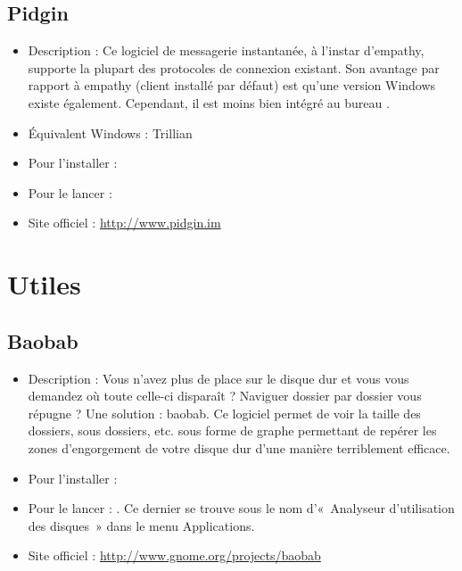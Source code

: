 \subsection{Pidgin}
\label{RefPidgin}
\begin{itemize}
\begingroup
{}
\item Description : Ce logiciel de messagerie instantanée, à l'instar d'empathy, supporte la plupart des protocoles de connexion existant. Son avantage par rapport à empathy (client installé par défaut) est qu'une version Windows existe également. Cependant, il est moins bien intégré au bureau .{\par}
\item Équivalent Windows : Trillian{\par}
\item Pour l'installer : 
\item Pour le lancer : 
\item Site officiel : \url{http://www.pidgin.im}{\par}
\endgroup
\end{itemize}
\section{Utiles}

\subsection{Baobab}
\begin{itemize}
\begingroup
{}
\item Description : Vous n'avez plus de place sur le disque dur et vous vous demandez où toute celle-ci disparaît ? Naviguer dossier par dossier vous répugne ? Une solution : baobab. Ce logiciel permet de voir la taille des dossiers, sous dossiers, etc. sous forme de graphe permettant de repérer les zones d'engorgement de votre disque dur d'une manière terriblement efficace.{\par}
\endgroup
\item Pour l'installer : 
\item Pour le lancer : . Ce dernier se trouve sous le nom d'«~Analyseur d'utilisation des disques~» dans le menu Applications.{\par}
\item Site officiel : \url{http://www.gnome.org/projects/baobab}{\par}
\end{itemize}
\newpage
